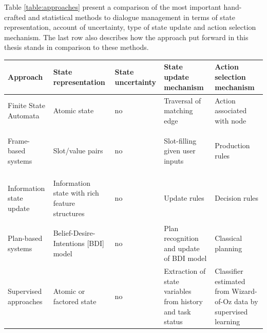 Table \ref{table:approaches} present a comparison of the most important hand-crafted and statistical methods to dialogue management in terms of state representation, account of uncertainty, type of state update and action selection mechanism.  The last row also describes how the approach put forward in this thesis stands in comparison to these methods. 
  
\renewcommand{\arraystretch}{2.0}
\setlength{\tabcolsep}{8pt}
\begin{table}
\begin{center}
\begin{tabular}{|p{50mm}||p{40mm}|p{18mm}|p{50mm}|p{58mm}|} \hline
\centering \textbf{Approach} &  \centering \textbf{State representation} &  \centering \textbf{State uncertainty} &  \centering \textbf{State update mechanism} & \textbf{Action selection mechanism} \vspace{5pt} \\  \hline \hline
Finite State Automata & Atomic state & no & Traversal of matching edge & Action associated with node \vspace{5pt} \\ \hline
Frame-based systems \begin{footnotesize}\citep[e.g.][]{seneff2000}\end{footnotesize}& Slot/value pairs & no & Slot-filling given user inputs & Production rules \vspace{5pt} \\ \hline
Information state update \begin{footnotesize}\citep[e.g.][]{Larsson:2000}\end{footnotesize} & Information state with rich feature structures \vspace{5pt} & no & Update rules & Decision rules \vspace{5pt} \\ \hline
Plan-based systems  \begin{footnotesize}\citep[e.g.][]{Freedman:2000,Allen:2001}\end{footnotesize} & Belief-Desire-Intentions [BDI] model \vspace{5pt} & no & Plan recognition and update of BDI model & Classical planning \vspace{5pt} \\ \hline
Supervised approaches \begin{footnotesize}\citep[e.g.][]{Hurtado:2005}\end{footnotesize} & Atomic or factored state & no & Extraction of state variables from history and task status & Classifier estimated from Wizard-of-Oz data by supervised learning \vspace{5pt} \\ \hline

\end{tabular}
\end{center}
\end{table}
